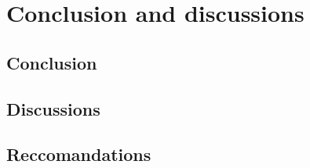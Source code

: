 \chapter{Conclusion and discussions}
\label{ch:conclusionanddiscussions}

\lipsum[1]

\section{Conclusion}
\label{sec:conclusion}

\lipsum[1]

\section{Discussions}
\label{sec:discussions}

\lipsum[1]

\section{Reccomandations}
\label{sec:reccomandations}

\lipsum[1]
